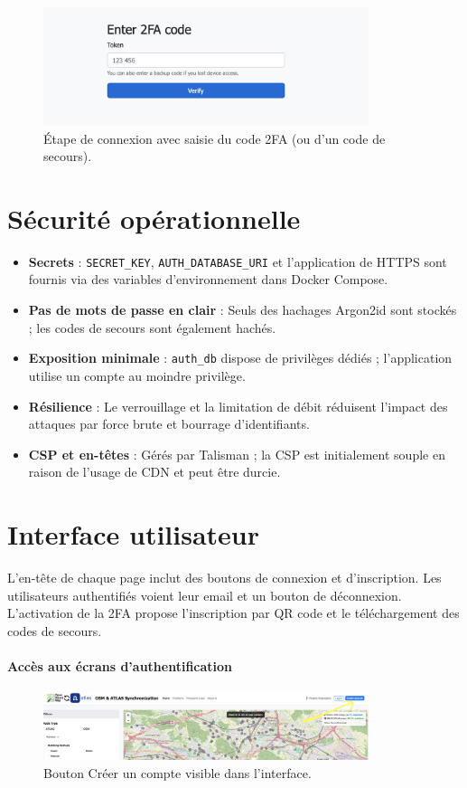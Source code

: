 \begin{figure}[h]
  \centering
  \includegraphics[width=0.85\textwidth]{../figures/chap10/enter2FA.png}
  \caption{Étape de connexion avec saisie du code 2FA (ou d'un code de secours).}
\end{figure}

\section{Sécurité opérationnelle}
\begin{itemize}
  \item \textbf{Secrets} : \texttt{SECRET\_KEY}, \texttt{AUTH\_DATABASE\_URI} et l'application de HTTPS sont fournis via des variables d'environnement dans Docker Compose.
  \item \textbf{Pas de mots de passe en clair} : Seuls des hachages Argon2id sont stockés ; les codes de secours sont également hachés.
  \item \textbf{Exposition minimale} : \texttt{auth\_db} dispose de privilèges dédiés ; l'application utilise un compte au moindre privilège.
  \item \textbf{Résilience} : Le verrouillage et la limitation de débit réduisent l'impact des attaques par force brute et bourrage d'identifiants.
  \item \textbf{CSP et en-têtes} : Gérés par Talisman ; la CSP est initialement souple en raison de l'usage de CDN et peut être durcie.
\end{itemize}

\section{Interface utilisateur}
L'en-tête de chaque page inclut des boutons de connexion et d'inscription. Les utilisateurs authentifiés voient leur email et un bouton de déconnexion. L'activation de la 2FA propose l'inscription par QR code et le téléchargement des codes de secours.

\paragraph{Accès aux écrans d'authentification}
\begin{figure}[h]
  \centering
  \includegraphics[width=0.85\textwidth]{../figures/chap10/auth1.png}
  \caption{Bouton \og Créer un compte \fg{} visible dans l'interface.}
\end{figure}

